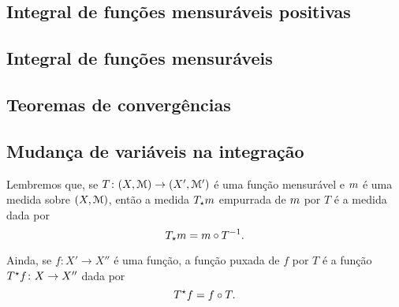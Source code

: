 \subsection{Integral de funções mensuráveis positivas}

\subsection{Integral de funções mensuráveis}

\subsection{Teoremas de convergências}

\subsection{Mudança de variáveis na integração}

Lembremos que, se $T\colon (X,\mathcal{M}) \to (X',\mathcal{M}')$ é uma função mensurável e $m$ é uma medida sobre $(X,\mathcal{M})$, então a medida $T_\star m$ empurrada de $m$ por $T$ é a medida dada por
	\begin{equation*}
	T_\star m = m \circ T^{-1}.
	\end{equation*}

Ainda, se $f\colon X' \to X''$ é uma função, a função puxada de $f$ por $T$ é a função $T^\star f\colon X \to X''$ dada por
	\begin{equation*}
	T^\star f = f \circ T.
	\end{equation*}

